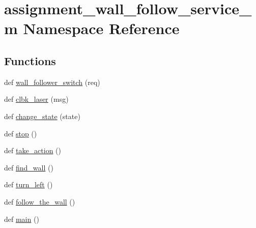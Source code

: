 \hypertarget{namespaceassignment__wall__follow__service__m}{}\section{assignment\+\_\+wall\+\_\+follow\+\_\+service\+\_\+m Namespace Reference}
\label{namespaceassignment__wall__follow__service__m}
\subsection*{Functions}
\begin{DoxyCompactItemize}
\item 
def \hyperlink{namespaceassignment__wall__follow__service__m_a6622ec7e139e0c7dc808bcec32739843}{wall\+\_\+follower\+\_\+switch} (req)
\item 
def \hyperlink{namespaceassignment__wall__follow__service__m_a034b7d3871fa0aed3175a05d05d28405}{clbk\+\_\+laser} (msg)
\item 
def \hyperlink{namespaceassignment__wall__follow__service__m_a0b1ad57ec76ad9ff34883a865e92fd5c}{change\+\_\+state} (state)
\item 
def \hyperlink{namespaceassignment__wall__follow__service__m_aa1aec1a0e12233bb423e93c5fe6a469d}{stop} ()
\item 
def \hyperlink{namespaceassignment__wall__follow__service__m_ad37d3c1bb41d16159633abb671f579e6}{take\+\_\+action} ()
\item 
def \hyperlink{namespaceassignment__wall__follow__service__m_a604c7f8ee14bc42dca58aeb06f1b1c4b}{find\+\_\+wall} ()
\item 
def \hyperlink{namespaceassignment__wall__follow__service__m_a96ade28a4099c7b97d72231fffa559d9}{turn\+\_\+left} ()
\item 
def \hyperlink{namespaceassignment__wall__follow__service__m_a03ebdb315996994bd54baa26b0975c5c}{follow\+\_\+the\+\_\+wall} ()
\item 
def \hyperlink{namespaceassignment__wall__follow__service__m_abf432a5355078536d7df8594eafafabf}{main} ()
\end{DoxyCompactItemize}
